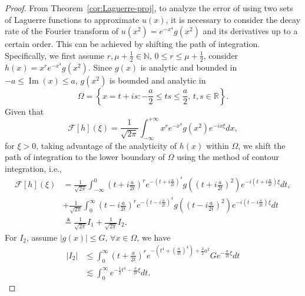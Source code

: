 \documentclass[pdflatex,sn-aps]{sn-jnl}%
\theoremstyle{thmstyleone}%
\theoremstyle{thmstyletwo}%
\theoremstyle{thmstylethree}%
\begin{document}
\begin{appendices}
\begin{proof}
  From Theorem~\ref{cor:Laguerre-proj}, to analyze the error of using two sets of Laguerre functions to approximate
  $u(x)$, it is necessary to consider the decay rate of the Fourier transform of
  $u(x^2) = e^{-x^4}g(x^2)$ and its derivatives up to a certain order.
  This can be achieved by shifting the path of integration. Specifically,
  we first assume $r,\mu+\frac{1}{2} \in \mathbb{N},\, 0 \leqslant r \leqslant \mu+\frac{1}{2}$,
  consider $h(x) = x^r e^{-x^4} g(x^2)$. Since $g(x)$ is analytic and bounded in
  $-a \leqslant \operatorname{Im}(x) \leqslant a$, $g(x^2)$ is bounded and analytic in
  \begin{equation}\label{eq:def-Omega}
    \Omega = \left\{ x=t+is: -\frac{a}{2} \leqslant ts \leqslant \frac{a}{2}, \, t,s \in \mathbb{R} \right\}.
  \end{equation}
  Given that
  \begin{equation}\label{eq:Fourier-h}
    \mathcal{F}[h](\xi)=\frac{1}{\sqrt{2 \pi}} \int_{-\infty}^{+\infty} x^r e^{-x^4} g\left(x^2\right) e^{-i x \xi} d x,
  \end{equation}
  for $\xi > 0$, taking advantage of the analyticity of $h(x)$ within $\Omega$,
  we shift the path of integration to the lower boundary of $\Omega$ using
  the method of contour integration, i.e.,
  \begin{equation}\label{eq:1209-2}
    \begin{aligned}
    \mathcal{F}[h](\xi) & =\frac{1}{\sqrt{2 \pi}} \int_{-\infty}^0\left(t+i \frac{a}{2 t}\right)^r e^{-\left(t+i \frac{a}{2 t}\right)^4} g\left(\left(t+i \frac{a}{2 t}\right)^2\right) e^{-i\left(t+i \frac{a}{2 t}\right) \xi} d t, \\
    & +\frac{1}{\sqrt{2 \pi}} \int_0^{\infty}\left(t-i \frac{a}{2 t}\right)^r e^{-\left(t-i \frac{a}{2 t}\right)^4} g\left(\left(t-i \frac{a}{2 t}\right)^2\right) e^{-i\left(t-i \frac{a}{2 t}\right) \xi} d t \\
    & \triangleq \frac{1}{\sqrt{2 \pi}} I_1+\frac{1}{\sqrt{2 \pi}} I_2.
    \end{aligned}
  \end{equation}
  For $I_2$, assume $|g(x)| \leqslant G,\, \forall x \in \Omega$, we have
  \begin{equation}\label{eq:1209-3}
    \begin{aligned}
    \left|I_2\right| & \leqslant \int_0^{\infty}\left(t+\frac{a}{2 t}\right)^r e^{-\left(t^4+\left(\frac{a}{2 t}\right)^4\right)+\frac{3}{2} a^2} G e^{-\frac{a}{2 t} \xi} d t \\
    & \lesssim \int_0^{\infty} e^{-\frac{1}{2} t^4-\frac{a}{2 t} \xi} d t.

\end{aligned}
\end{equation}
\end{proof}
\end{appendices}
\end{document}
